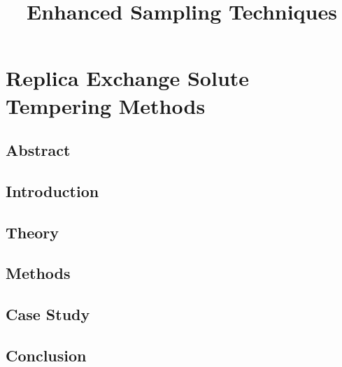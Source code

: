\documentclass{memoir}
\title{Enhanced Sampling Techniques}
\begin{document}
\date{}

\maketitle

\tableofcontents

\chapter{Replica Exchange Solute Tempering Methods}

\section{Abstract}


\section{Introduction}

  
\section{Theory} 



\section{Methods}



\section{Case Study}

%

\section{Conclusion}



\end{document}
